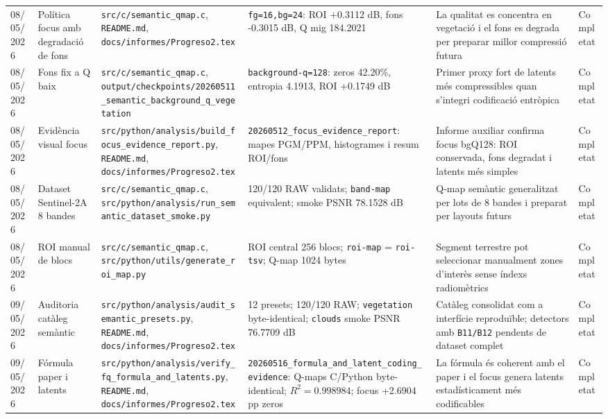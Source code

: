 \documentclass[11pt,a4paper]{article}
\begin{document}
\begin{longtable}{p{1.7cm} p{2.3cm} p{2.6cm} p{2.8cm} p{2.1cm} p{2.0cm}}
08/05/2026 & Política focus amb degradació de fons & \texttt{src/c/semantic\_qmap.c}, \texttt{README.md}, \texttt{docs/informes/Progreso2.tex} & \texttt{fg=16,bg=24}: ROI +0.3112 dB, fons -0.3015 dB, Q mig 184.2021 & La qualitat es concentra en vegetació i el fons es degrada per preparar millor compressió futura & Completat \\
08/05/2026 & Fons fix a Q baix & \texttt{src/c/semantic\_qmap.c}, \texttt{output/checkpoints/20260511\_semantic\_background\_q\_vegetation} & \texttt{background-q=128}: zeros 42.20\%, entropia 4.1913, ROI +0.1749 dB & Primer proxy fort de latents més compressibles quan s'integri codificació entròpica & Completat \\
08/05/2026 & Evidència visual focus & \texttt{src/python/analysis/build\_focus\_evidence\_report.py}, \texttt{README.md}, \texttt{docs/informes/Progreso2.tex} & \texttt{20260512\_focus\_evidence\_report}: mapes PGM/PPM, histogrames i resum ROI/fons & Informe auxiliar confirma focus bgQ128: ROI conservada, fons degradat i latents més simples & Completat \\
08/05/2026 & Dataset Sentinel-2A 8 bandes & \texttt{src/c/semantic\_qmap.c}, \texttt{src/python/analysis/run\_semantic\_dataset\_smoke.py} & 120/120 RAW validats; \texttt{band-map} equivalent; smoke PSNR 78.1528 dB & Q-map semàntic generalitzat per lots de 8 bandes i preparat per layouts futurs & Completat \\
08/05/2026 & ROI manual de blocs & \texttt{src/c/semantic\_qmap.c}, \texttt{src/python/utils/generate\_roi\_map.py} & ROI central 256 blocs; \texttt{roi-map} = \texttt{roi-tsv}; Q-map 1024 bytes & Segment terrestre pot seleccionar manualment zones d'interès sense índexs radiomètrics & Completat \\
09/05/2026 & Auditoria catàleg semàntic & \texttt{src/python/analysis/audit\_semantic\_presets.py}, \texttt{README.md}, \texttt{docs/informes/Progreso2.tex} & 12 presets; 120/120 RAW; \texttt{vegetation} byte-identical; \texttt{clouds} smoke PSNR 76.7709 dB & Catàleg consolidat com a interfície reproduïble; detectors amb \texttt{B11/B12} pendents de dataset complet & Completat \\
09/05/2026 & Fórmula paper i latents & \texttt{src/python/analysis/verify\_fq\_formula\_and\_latents.py}, \texttt{README.md}, \texttt{docs/informes/Progreso2.tex} & \texttt{20260516\_formula\_and\_latent\_coding\_evidence}: Q-maps C/Python byte-identical; $R^2=0.998984$; focus +2.6904 pp zeros & La fórmula és coherent amb el paper i el focus genera latents estadísticament més codificables & Completat \\

\end{longtable}
\end{document}
